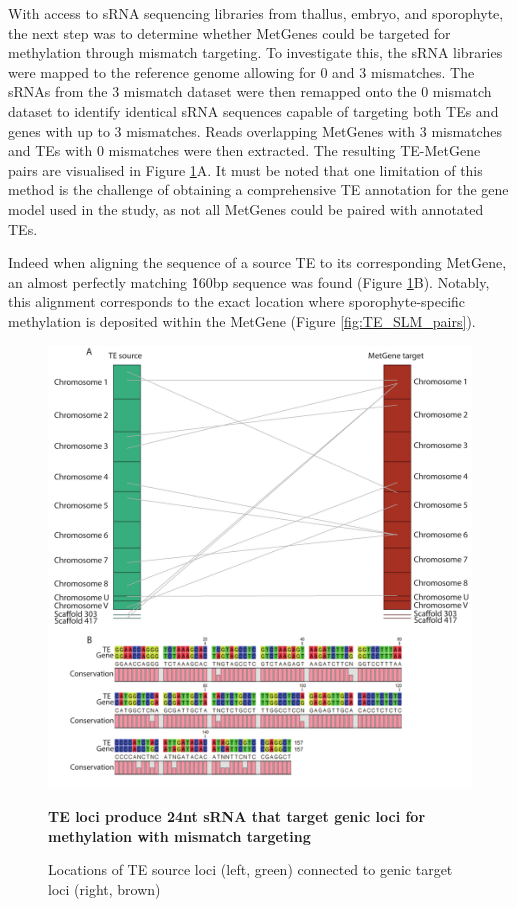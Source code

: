 With access to sRNA sequencing libraries from thallus, embryo, and sporophyte, the next step was to determine whether MetGenes could be targeted for methylation through mismatch targeting. To investigate this, the sRNA libraries were mapped to the reference genome allowing for 0 and 3 mismatches. The sRNAs from the 3 mismatch dataset were then remapped onto the 0 mismatch dataset to identify identical sRNA sequences capable of targeting both TEs and genes with up to 3 mismatches. Reads overlapping MetGenes with 3 mismatches and TEs with 0 mismatches were then extracted. The resulting TE-MetGene pairs are visualised in Figure \ref{fig:SLM_targeting}A. It must be noted that one limitation of this method is the challenge of obtaining a comprehensive TE annotation for the gene model used in the study, as not all MetGenes could be paired with annotated TEs.

Indeed when aligning the sequence of a source TE to its corresponding MetGene, an almost perfectly matching \~160bp sequence was found (Figure \ref{fig:SLM_targeting}B). Notably, this alignment corresponds to the exact location where sporophyte-specific methylation is deposited within the MetGene (Figure \ref{fig:TE_SLM_pairs}).

\begin{figure}[htbp!] 
\centering    
    \includegraphics[width=1\textwidth]{Chapter3/Figs/Figure5_SLM_source_target.pdf}
\caption{\textbf{TE loci produce 24nt sRNA that target genic loci for methylation with mismatch targeting}}
\label{fig:SLM_targeting}
\captionsetup{font=small}
    \caption*{Locations of TE source loci (left, green) connected to genic target loci (right, brown)}
\end{figure}


